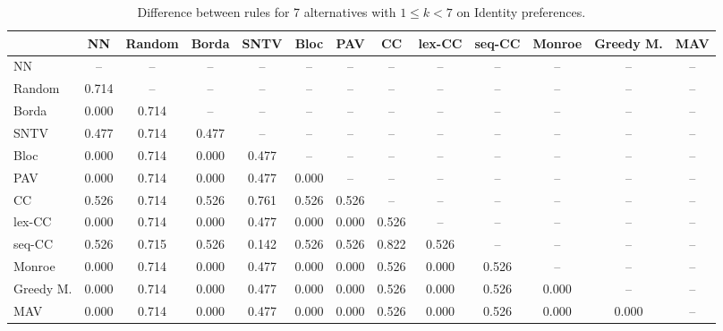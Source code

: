 
\begin{table*}[h!]
\centering
\begin{tabular}{lcccccccccccc}
\toprule
 & NN & Random & Borda & SNTV & Bloc & PAV & CC & lex-CC & seq-CC & Monroe & Greedy M. & MAV \\
\midrule
NN & -- & -- & -- & -- & -- & -- & -- & -- & -- & -- & -- & -- \\
Random & 0.714 & -- & -- & -- & -- & -- & -- & -- & -- & -- & -- & -- \\
Borda & 0.000 & 0.714 & -- & -- & -- & -- & -- & -- & -- & -- & -- & -- \\
SNTV & 0.477 & 0.714 & 0.477 & -- & -- & -- & -- & -- & -- & -- & -- & -- \\
Bloc & 0.000 & 0.714 & 0.000 & 0.477 & -- & -- & -- & -- & -- & -- & -- & -- \\
PAV & 0.000 & 0.714 & 0.000 & 0.477 & 0.000 & -- & -- & -- & -- & -- & -- & -- \\
CC & 0.526 & 0.714 & 0.526 & 0.761 & 0.526 & 0.526 & -- & -- & -- & -- & -- & -- \\
lex-CC & 0.000 & 0.714 & 0.000 & 0.477 & 0.000 & 0.000 & 0.526 & -- & -- & -- & -- & -- \\
seq-CC & 0.526 & 0.715 & 0.526 & 0.142 & 0.526 & 0.526 & 0.822 & 0.526 & -- & -- & -- & -- \\
Monroe & 0.000 & 0.714 & 0.000 & 0.477 & 0.000 & 0.000 & 0.526 & 0.000 & 0.526 & -- & -- & -- \\
Greedy M. & 0.000 & 0.714 & 0.000 & 0.477 & 0.000 & 0.000 & 0.526 & 0.000 & 0.526 & 0.000 & -- & -- \\
MAV & 0.000 & 0.714 & 0.000 & 0.477 & 0.000 & 0.000 & 0.526 & 0.000 & 0.526 & 0.000 & 0.000 & -- \\
\bottomrule
\end{tabular}

\caption{Difference between rules for 7 alternatives with $1 \leq k < 7$ on Identity preferences.}
\end{table*}
